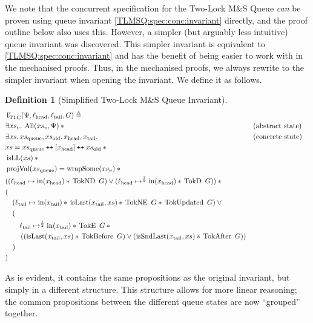 \documentclass[a4paper, 10pt]{report}
\theoremstyle{definition}
\newtheorem{definition}{Definition}[section]
\newcommand{\msq}{M\&S Queue}
\newcommand{\tlmsq}{Two-Lock \msq{}}
\newcommand{\TLQueueInvariantConcSimpl}{\operatorname{I^{\prime}_{TLC}}}
\newcommand{\xsc}{xs}
\newcommand{\xsqueue}{xs_{\mathrm{queue}}}
\newcommand{\xsold}{xs_{\mathrm{old}}}
\newcommand{\isLL}{\operatorname{isLL}}
\newcommand{\AllP}{\operatorname{All}}
\newcommand{\projval}{\operatorname{projVal}}
\newcommand{\wrapsome}{\operatorname{wrapSome}}
\newcommand{\isLast}{\operatorname{isLast}}
\newcommand{\isSndLast}{\operatorname{isSndLast}}
\newcommand{\locN}[1]{\loc_{\mathrm{#1}}}
\newcommand{\lochead}{\locN{head}}
\newcommand{\loctail}{\locN{tail}}
\newcommand{\nIn}[1]{\operatorname{in}(#1)}
\newcommand{\node}{x}
\newcommand{\nodeN}[1]{\node_{\mathrm{#1}}}
\newcommand{\nodehead}{\nodeN{head}}
\newcommand{\nodetail}{\nodeN{tail}}
\newcommand{\absvalueList}{xs_v}
\newcommand{\Qg}{G}
\newcommand{\TokE}[1]{\operatorname{TokE} ~ #1}
\newcommand{\TokEQg}{\TokE{\Qg}}
\newcommand{\TokNE}[1]{\operatorname{TokNE} ~ #1}
\newcommand{\TokNEQg}{\TokNE{\Qg}}
\newcommand{\TokD}[1]{\operatorname{TokD} ~ #1}
\newcommand{\TokDQg}{\TokD{\Qg}}
\newcommand{\TokND}[1]{\operatorname{TokND} ~ #1}
\newcommand{\TokNDQg}{\TokND{\Qg}}
\newcommand{\TokBefore}[1]{\operatorname{TokBefore} ~ #1}
\newcommand{\TokBeforeQg}{\TokBefore{\Qg}}
\newcommand{\TokAfter}[1]{\operatorname{TokAfter} ~ #1}
\newcommand{\TokAfterQg}{\TokAfter{\Qg}}
\newcommand{\TokUpdated}[1]{\operatorname{TokUpdated} ~ #1}
\newcommand{\TokUpdatedQg}{\TokUpdated{\Qg}}
\newcommand\catenate{\mathbin{\text{\ttfamily\upshape ++}}}
\begin{document}
We note that the concurrent specification for the \tlmsq{} \textit{can} be proven using queue invariant \ref{TLMSQ:spec:conc:invariant} directly, and the proof outline below also uses this. However, a simpler (but arguably less intuitive) queue invariant was discovered. This simpler invariant is equivalent to \ref{TLMSQ:spec:conc:invariant} and has the benefit of being easier to work with in the mechanised proofs. Thus, in the mechanised proofs, we always rewrite to the simpler invariant when opening the invariant. We define it as follows.
\begin{definition}[Simplified \tlmsq{} Invariant]\label{TLMSQ:spec:conc:invariant:simple}
  \begin{align*}
    &\TLQueueInvariantConcSimpl(\Psi, \lochead, \loctail, \Qg) \eqdef\\
    &\Exists \absvalueList. \AllP(\absvalueList, \Psi) \star{} &&\text{(abstract state)}\\
    &\Exists \xsc, \xsqueue, \xsold, \nodehead, \nodetail . &&\text{(concrete state)}\\
    &\xsc = \xsqueue \catenate [\nodehead] \catenate \xsold \star{}\\
    &\isLL(\xsc) \star{}\\
    &\projval(\xsqueue) = \wrapsome(\absvalueList) \star{}\\
    &((\lochead \mapsto \nIn{\nodehead} \star{} \TokNDQg) \lor{} (\lochead \mapsto^{\frac{1}{2}} \nIn{\nodehead} \star{} \TokDQg)) \star{}\\
    &(\\
    &\quad(\loctail \mapsto \nIn{\nodetail} \star{} \isLast(\nodetail, \xsc) \star{} \TokNEQg \star{} \TokUpdatedQg) \lor{} \\
    &\quad(\\
    &\quad\quad \loctail \mapsto^{\frac{1}{2}} \nIn{\nodetail} \star{} \TokEQg \star{}\\
    &\quad\quad\left((\isLast(\nodetail, \xsc) \star{} \TokBeforeQg) \lor{} (\isSndLast(\nodetail, \xsc) \star{} \TokAfterQg)\right)\\
    &\quad)\\
    &)
  \end{align*}
\end{definition}
As is evident, it contains the same propositions as the original invariant, but simply in a different structure. This structure allows for more linear reasoning; the common propositions between the different queue states are now ``grouped'' together.
\end{document}
